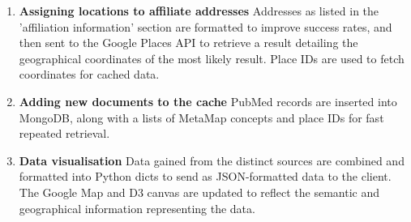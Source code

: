 \documentclass[Report.tex]{subfiles}
\begin{document}
\begin{enumerate}
\item{\textbf{Assigning locations to affiliate addresses}}
\newline Addresses as listed in the 'affiliation information' section are formatted to improve success rates, and then sent to the Google Places API to retrieve a result detailing the geographical coordinates of the most likely result. Place IDs are used to fetch coordinates for cached data.
\item{\textbf{Adding new documents to the cache}}
\newline PubMed records are inserted into MongoDB, along with a lists of MetaMap concepts and place IDs for fast repeated retrieval.
\item{\textbf{Data visualisation}}
\newline Data gained from the distinct sources are combined and formatted into Python dicts to send as JSON-formatted data to the client. The Google Map and D3 canvas are updated to reflect the semantic and geographical information representing the data.
\end{enumerate}
\end{document}
